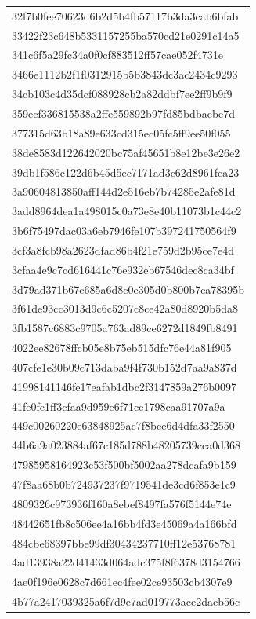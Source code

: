 \begin{tabular}{l}
32f7b0fee70623d6b2d5b4fb57117b3da3cab6bfab \\
33422f23c648b5331157255ba570cd21e0291c14a5 \\
341c6f5a29fc34a0f0cf883512ff57cae052f4731e \\
3466e1112b2f1f0312915b5b3843dc3ac2434c9293 \\
34cb103c4d35dcf088928cb2a82ddbf7ee2ff9b9f9 \\
359ecf336815538a2ffe559892b97fd85bdbaebe7d \\
377315d63b18a89e633cd315ec05fc5ff9ee50f055 \\
38de8583d122642020bc75af45651b8e12be3e26e2 \\
39db1f586c122d6b45d5ec7171ad3c62d8961fca23 \\
3a90604813850aff144d2e516eb7b74285e2afe81d \\
3add8964dea1a498015c0a73e8e40b11073b1c44c2 \\
3b6f75497dac03a6eb7946fe107b397241750564f9 \\
3cf3a8fcb98a2623dfad86b4f21e759d2b95ce7e4d \\
3cfaa4e9c7cd616441c76e932eb67546dec8ca34bf \\
3d79ad371b67c685a6d8c0e305d0b800b7ea78395b \\
3f61de93cc3013d9c6c5207c8ce42a80d8920b5da8 \\
3fb1587c6883c9705a763ad89ce6272d1849fb8491 \\
4022ee82678ffcb05e8b75eb515dfc76e44a81f905 \\
407cfe1e30b09c713daba9f4f730b152d7aa9a837d \\
41998141146fe17eafab1dbc2f3147859a276b0097 \\
41fe0fc1ff3cfaa9d959e6f71ce1798caa91707a9a \\
449c00260220e63848925ac7f8bce6d4dfa33f2550 \\
44b6a9a023884af67c185d788b48205739cca0d368 \\
47985958164923c53f500bf5002aa278dcafa9b159 \\
47f8aa68b0b724937237f9719541de3cd6f853e1c9 \\
4809326c973936f160a8ebef8497fa576f5144e74e \\
48442651fb8c506ee4a16bb4fd3e45069a4a166bfd \\
484cbe68397bbe99df30434237710ff12e53768781 \\
4ad13938a22d41433d064adc375f8f6378d3154766 \\
4ae0f196e0628c7d661ec4fee02ce93503cb4307e9 \\
4b77a2417039325a6f7d9e7ad019773ace2dacb56c \\

\end{tabular}
